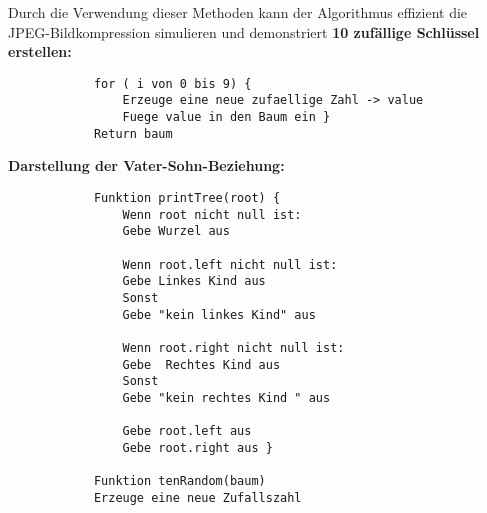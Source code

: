 \documentclass[12pt]{article}
\begin{document}
Durch die Verwendung dieser Methoden kann der Algorithmus effizient die JPEG-Bildkompression simulieren und demonstriert 
		\newline
		\textbf{10 zufällige Schlüssel erstellen:}
		\begin{lstlisting} 
			for ( i von 0 bis 9) {
				Erzeuge eine neue zufaellige Zahl -> value
				Fuege value in den Baum ein }
			Return baum
		\end{lstlisting} 
		\newpage %
		\textbf{Darstellung der Vater-Sohn-Beziehung:}
		\begin{lstlisting}
			Funktion printTree(root) {
				Wenn root nicht null ist:
				Gebe Wurzel aus
				
				Wenn root.left nicht null ist:
				Gebe Linkes Kind aus
				Sonst
				Gebe "kein linkes Kind" aus
				
				Wenn root.right nicht null ist:
				Gebe  Rechtes Kind aus
				Sonst
				Gebe "kein rechtes Kind " aus
				
				Gebe root.left aus
				Gebe root.right aus }
			
			Funktion tenRandom(baum)
			Erzeuge eine neue Zufallszahl
			
		\end{lstlisting}
		
\end{document}
